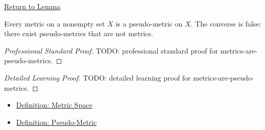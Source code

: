 \newpage
{}
\label{prf:metrics-are-pseudo-metrics}

\begin{remark*}[Return]
\hyperref[lem:metrics-are-pseudo-metrics]{Return to Lemma}
\end{remark*}

\begin{lemma*}
Every metric on a nonempty set \(X\) is a pseudo-metric on \(X\).
The converse is false: there exist pseudo-metrics that are not metrics.
\end{lemma*}

\begin{proof}[Professional Standard Proof]
\LRAProofBodyStart
TODO: professional standard proof for metrics-are-pseudo-metrics.
\end{proof}

\begin{proof}[Detailed Learning Proof]
\LRAProofBodyStart
TODO: detailed learning proof for metrics-are-pseudo-metrics.
\end{proof}

\begin{remark*}
\end{remark*}

\begin{dependencies}
\begin{itemize}
  \item \hyperref[def:metric-space]{Definition: Metric Space}
  \item \hyperref[def:pseudo-metric]{Definition: Pseudo-Metric}
\end{itemize}
\end{dependencies}

\clearpage
